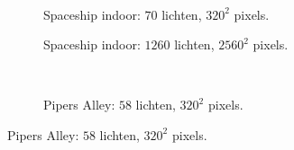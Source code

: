 \begin{figure}[t]
\begin{subfigure}[b]{\textwidth}
  \end{subfigure}\hfill\\
  \begin{adjustbox}{minipage=\textwidth, scale=0.55}
    \begin{subfigure}[b]{0.8\textwidth}
      \centering
      \def\svgwidth{\textwidth}
      
      \caption{Spaceship indoor: $70$ lichten, $320^2$ pixels.}
      \label{fig:cs-frames-stacked:indoor-70}
    \end{subfigure}
  \end{adjustbox}\hspace{-0.075\textwidth}  %
  \begin{adjustbox}{minipage=\textwidth, scale=0.55}
    \begin{subfigure}[b]{0.8\textwidth}
      \centering
      \def\svgwidth{\textwidth}
      
      \caption{Spaceship indoor: $1260$ lichten, $2560^2$ pixels.}
      \label{fig:cs-frames-stacked:indoor-2560}
    \end{subfigure}
  \end{adjustbox} \\
  \begin{adjustbox}{minipage=\textwidth, scale=0.55}
    \begin{subfigure}[b]{0.8\textwidth}
      \centering
      \def\svgwidth{\textwidth}
      
      \caption{Pipers Alley: $58$ lichten, $320^2$ pixels.}
      \label{fig:cs-frames-stacked:alley-320}
    \end{subfigure}
  \end{adjustbox}\hspace{-0.075\textwidth}  %
  \begin{adjustbox}{minipage=\textwidth, scale=0.55}

\end{adjustbox}
\end{figure}
